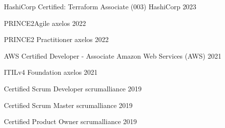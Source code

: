 

\begin{cvhonors}

  \cvhonor
    {HashiCorp Certified: Terraform Associate (003)} %
    {HashiCorp} %
    {} %
    {2023} %

\cvhonor
{PRINCE2Agile} %
{axelos} %
{} %
{2022} %

\cvhonor
{PRINCE2 Practitioner} %
{axelos} %
{} %
{2022} %

  \cvhonor
    {AWS Certified Developer - Associate} %
    {Amazon Web Services (AWS)} %
    {} %
    {2021} %

\cvhonor
{ITILv4 Foundation} %
{axelos} %
{} %
{2021} %

\cvhonor
{Certified Scrum Developer} %
{scrumalliance} %
{} %
{2019} %

\cvhonor
{Certified Scrum Master} %
{scrumalliance} %
{} %
{2019} %

\cvhonor
{Certified Product Owner} %
{scrumalliance} %
{} %
{2019} %

\end{cvhonors}
